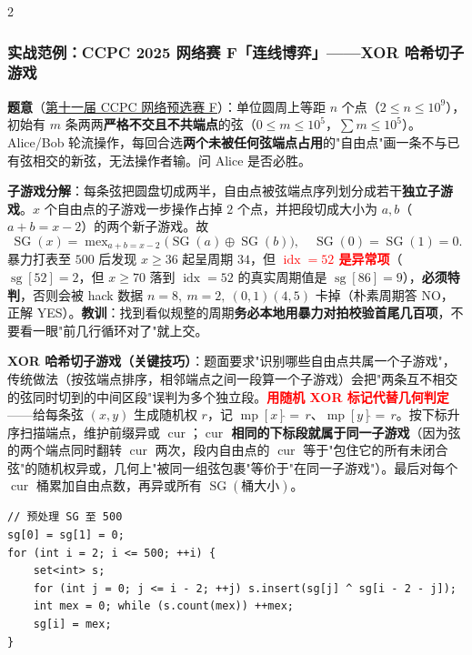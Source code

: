 \begin{multicols*}{2}
		\subsubsection{实战范例：CCPC 2025 网络赛 F「连线博弈」——XOR 哈希切子游戏}

		\textbf{题意}（\href{https://qoj.ac/contest/2534}{第十一届 CCPC 网络预选赛 F}）：单位圆周上等距 $n$ 个点（$2 \le n \le 10^9$），初始有 $m$ 条两两\textbf{严格不交且不共端点}的弦（$0 \le m \le 10^5$，$\sum m \le 10^5$）。Alice/Bob 轮流操作，每回合选\textbf{两个未被任何弦端点占用}的"自由点"画一条不与已有弦相交的新弦，无法操作者输。问 Alice 是否必胜。

		\textbf{子游戏分解}：每条弦把圆盘切成两半，自由点被弦端点序列划分成若干\textbf{独立子游戏}。$x$ 个自由点的子游戏一步操作占掉 $2$ 个点，并把段切成大小为 $a, b$（$a + b = x - 2$）的两个新子游戏。故
		\[
			\operatorname{SG}(x) = \mathop{\mathrm{mex}}_{a + b = x - 2} \bigl(\operatorname{SG}(a) \oplus \operatorname{SG}(b)\bigr),\quad \operatorname{SG}(0) = \operatorname{SG}(1) = 0.
		\]
		暴力打表至 $500$ 后发现 $x \ge 36$ 起呈周期 $34$，但 \textcolor{red}{\textbf{$\operatorname{idx} = 52$ 是异常项}}（$\operatorname{sg}[52] = 2$，但 $x \ge 70$ 落到 $\operatorname{idx} = 52$ 的真实周期值是 $\operatorname{sg}[86] = 9$），\textbf{必须特判}，否则会被 hack 数据 $n=8,\ m=2,\ (0,1)(4,5)$ 卡掉（朴素周期答 NO，正解 YES）。\textbf{教训}：找到看似规整的周期\textbf{务必本地用暴力对拍校验首尾几百项}，不要看一眼"前几行循环对了"就上交。

		\textbf{XOR 哈希切子游戏（关键技巧）}：题面要求"识别哪些自由点共属一个子游戏"，传统做法（按弦端点排序，相邻端点之间一段算一个子游戏）会把"两条互不相交的弦同时切到的中间区段"误判为多个独立段。\textcolor{red}{\textbf{用随机 XOR 标记代替几何判定}}——给每条弦 $(x, y)$ 生成随机权 $r$，记 $\operatorname{mp}[x] \mathbin{\hat{}{=}}\, r$、$\operatorname{mp}[y] \mathbin{\hat{}{=}}\, r$。按下标升序扫描端点，维护前缀异或 $\operatorname{cur}$；\textbf{$\operatorname{cur}$ 相同的下标段就属于同一子游戏}（因为弦的两个端点同时翻转 $\operatorname{cur}$ 两次，段内自由点的 $\operatorname{cur}$ 等于"包住它的所有未闭合弦"的随机权异或，几何上"被同一组弦包裹"等价于"在同一子游戏"）。最后对每个 $\operatorname{cur}$ 桶累加自由点数，再异或所有 $\operatorname{SG}(\text{桶大小})$。

		\begin{verbatim}
// 预处理 SG 至 500
sg[0] = sg[1] = 0;
for (int i = 2; i <= 500; ++i) {
    set<int> s;
    for (int j = 0; j <= i - 2; ++j) s.insert(sg[j] ^ sg[i - 2 - j]);
    int mex = 0; while (s.count(mex)) ++mex;
    sg[i] = mex;
}


\end{verbatim}
\end{multicols*}

